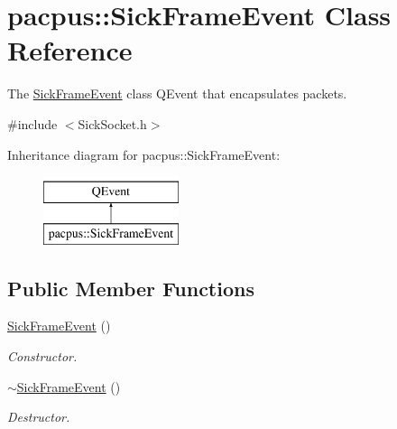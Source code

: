 \hypertarget{classpacpus_1_1SickFrameEvent}{\section{pacpus\-:\-:Sick\-Frame\-Event Class Reference}
\label{classpacpus_1_1SickFrameEvent}
}


The \hyperlink{classpacpus_1_1SickFrameEvent}{Sick\-Frame\-Event} class Q\-Event that encapsulates packets.  




{\ttfamily \#include $<$Sick\-Socket.\-h$>$}

Inheritance diagram for pacpus\-:\-:Sick\-Frame\-Event\-:\begin{figure}[H]
\begin{center}
\leavevmode
\includegraphics[height=2.000000cm]{classpacpus_1_1SickFrameEvent}
\end{center}
\end{figure}
\subsection*{Public Member Functions}
\begin{DoxyCompactItemize}
\item 
\hypertarget{classpacpus_1_1SickFrameEvent_a505ccae5cb63fee4ac3e30c8dbcc790b}{\hyperlink{classpacpus_1_1SickFrameEvent_a505ccae5cb63fee4ac3e30c8dbcc790b}{Sick\-Frame\-Event} ()}\label{classpacpus_1_1SickFrameEvent_a505ccae5cb63fee4ac3e30c8dbcc790b}

\begin{DoxyCompactList}\small\item\em Constructor. \end{DoxyCompactList}\item 
\hypertarget{classpacpus_1_1SickFrameEvent_a3028129c6245ac577323aa511be2b3a1}{\hyperlink{classpacpus_1_1SickFrameEvent_a3028129c6245ac577323aa511be2b3a1}{$\sim$\-Sick\-Frame\-Event} ()}\label{classpacpus_1_1SickFrameEvent_a3028129c6245ac577323aa511be2b3a1}

\begin{DoxyCompactList}\small\item\em Destructor. \end{DoxyCompactList}\end{DoxyCompactItemize}
